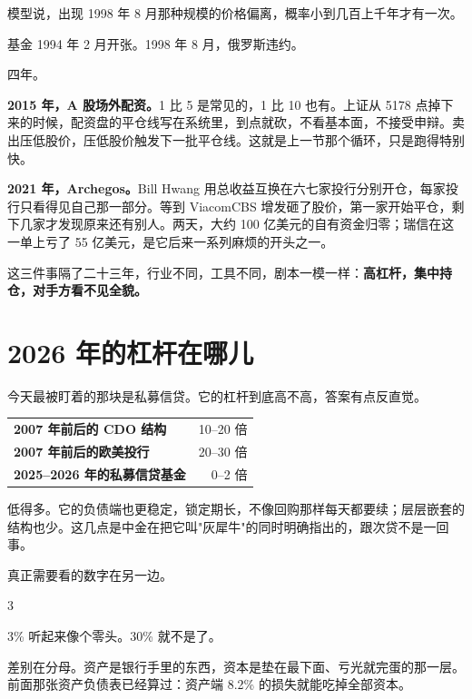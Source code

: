 模型说，出现 1998 年 8 月那种规模的价格偏离，概率小到几百上千年才有一次。

基金 1994 年 2 月开张。1998 年 8 月，俄罗斯违约。

四年。

\textbf{2015 年，A 股场外配资。}1 比 5 是常见的，1 比 10 也有。上证从 5178 点掉下来的时候，配资盘的平仓线写在系统里，到点就砍，不看基本面，不接受申辩。卖出压低股价，压低股价触发下一批平仓线。这就是上一节那个循环，只是跑得特别快。

\textbf{2021 年，Archegos。}Bill Hwang 用总收益互换在六七家投行分别开仓，每家投行只看得见自己那一部分。等到 ViacomCBS 增发砸了股价，第一家开始平仓，剩下几家才发现原来还有别人。两天，大约 100 亿美元的自有资金归零；瑞信在这一单上亏了 55 亿美元，是它后来一系列麻烦的开头之一。

这三件事隔了二十三年，行业不同，工具不同，剧本一模一样：\textbf{高杠杆，集中持仓，对手方看不见全貌。}

\section{2026 年的杠杆在哪儿}

今天最被盯着的那块是私募信贷。它的杠杆到底高不高，答案有点反直觉。

\begin{tablewrap}
\begin{xltabular}{\linewidth}{Xr}
\toprule
{} &  \\
\midrule
\textbf{2007 年前后的 CDO 结构} & 10–20 倍 \\
\textbf{2007 年前后的欧美投行} & 20–30 倍 \\
\textbf{2025–2026 年的私募信贷基金} & 0–2 倍 \\
\bottomrule
\end{xltabular}
\end{tablewrap}

低得多。它的负债端也更稳定，锁定期长，不像回购那样每天都要续；层层嵌套的结构也少。这几点是中金在把它叫"灰犀牛"的同时明确指出的，跟次贷不是一回事。

真正需要看的数字在另一边。

\begin{statrow}{3}
\end{statrow}

3\% 听起来像个零头。30\% 就不是了。

差别在分母。资产是银行手里的东西，资本是垫在最下面、亏光就完蛋的那一层。前面那张资产负债表已经算过：资产端 8.2\% 的损失就能吃掉全部资本。


